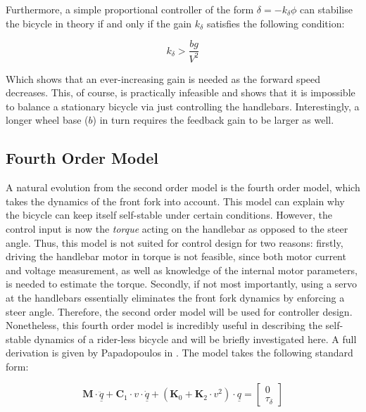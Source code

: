 Furthermore, a simple proportional controller of the form $\delta=-k_{\delta} \phi$ can stabilise the bicycle in theory if and only if the gain $k_{\delta}$ satisfies the following condition:

\begin{equation}
k_{\delta} > \frac{b g}{V^2}
\label{eq:minGain}
\end{equation}

Which shows that an ever-increasing gain is needed as the forward speed decreases. This, of course, is practically infeasible and shows that it is impossible to balance a stationary bicycle via just controlling the handlebars. Interestingly, a longer wheel base ($b$) in turn requires the feedback gain to be larger as well.

\subsection{Fourth Order Model} \label{FourthOrder}
A natural evolution from the second order model is the fourth order model, which takes the dynamics of the front fork into account. This model can explain why the bicycle can keep itself self-stable under certain conditions. However, the control input is now the \textit{torque} acting on the handlebar as opposed to the steer angle. Thus, this model is not suited for control design for two reasons: firstly, driving the handlebar motor in torque is not feasible, since both motor current and voltage measurement, as well as knowledge of the internal motor parameters, is needed to estimate the torque. Secondly, if not most importantly, using a servo at the handlebars essentially eliminates the front fork dynamics by enforcing a steer angle. Therefore, the second order model will be used for controller design. \\
Nonetheless, this fourth order model is incredibly useful in describing the self-stable dynamics of a rider-less bicycle and will be briefly investigated here. A full derivation is given by Papadopoulos in \cite{fourthorder}. The model takes the following standard form:

\begin{equation*}
\mathbf{M} \cdot \underline{\ddot{q}} + \mathbf{C}_1 \cdot v \cdot \underline{\dot{q}} + (\mathbf{K}_0 + \mathbf{K}_2 \cdot v^2) \cdot \underline{q} = \begin{bmatrix}
0 \\ \tau_{\delta}
\end{bmatrix}
\end{equation*}

